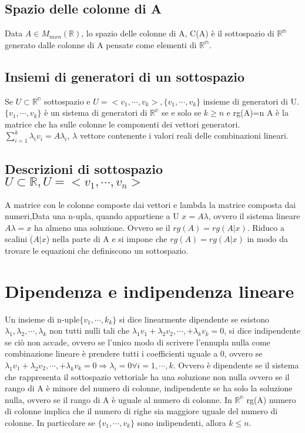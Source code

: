 \subsection{Spazio delle colonne di A}
Data $A\in M_{mxn}(\mathbb{R})$, lo spazio delle colonne di A, C(A) \`e il sottospazio di $\mathbb{R^m}$ generato dalle colonne di A pensate come elementi di $\mathbb{R^m}$.
\subsection{Insiemi di generatori di un sottospazio}
Se $U\subset\mathbb{R^n}$ sottospazio e $U=<v_1,\cdots,v_k>, \{v_1,\cdots,v_k\}$ insieme di generatori di U. $\{v_1,\cdots,v_k\}$ \`e un sistema di generatori di 
$\mathbb{R^n}$ se e solo se $k\ge n$ e rg(A)=n A \`e la matrice che ha sulle colonne le componenti dei vettori generatori. $\sum\limits_{i=1}^k \lambda_i v_i=A\lambda_i$, 
$\lambda$ vettore contenente i valori reali delle combinazioni lineari.
\subsection{Descrizioni di sottospazio $U\subset\mathbb{R}, U=<v_1,\cdots,v_n>$}
A matrice con le colonne composte dai vettori e lambda la matrice composta dai numeri,Data una n-upla, quando appartiene a U $x=A\lambda$, ovvero il sistema lineare $A
\lambda=x$ ha almeno una soluzione. Ovvero se il $rg(A)=rg(A|x)$. Riduco a scalini ($A|x$) nella parte di A e si impone che $rg(A)=rg(A|x)$ in modo da trovare le equazioni 
che definiscono un sottospazio.
\section{Dipendenza e indipendenza lineare}
Un insieme di n-uple$\{v_1,\cdots,k_k\}$ si dice linearmente dipendente se esistono $\lambda_1, \lambda_2,\cdots, \lambda_k$ non tutti nulli tali che $\lambda_1v_1+
\lambda_2v_2,\cdots,+\lambda_kv_k=0$, si dice indipendente se ci\`o non accade, ovvero se l'unico modo di scrivere l'ennupla nulla come combinazione lineare \`e prendere
tutti i coefficienti uguale a 0, ovvero se $\lambda_1v_1+\lambda_2v_2,\cdots,+\lambda_kv_k=0\Rightarrow\lambda_i=0\forall i=1,\cdots, k$. Ovvero \`e dipendente se il sistema
che rappresenta il sottospazio vettoriale ha una soluzione non nulla ovvero se il rango di A \`e minore del numero di colonne, indipendente se ha solo la soluzione nulla, ovvero se il rango di A \`e uguale al numero di colonne. In $\mathbb{R^n}$ rg(A) numero di colonne implica che il numero di righe sia maggiore uguale del numero di colonne.
In particolare se $\{v_1,\cdots,v_k\}$ sono indipendenti, allora $k\le n$. 
